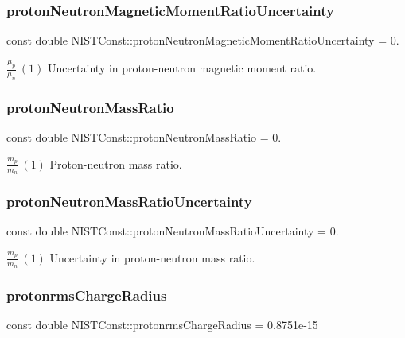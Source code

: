 \subsubsection{\texorpdfstring{proton\+Neutron\+Magnetic\+Moment\+Ratio\+Uncertainty}{protonNeutronMagneticMomentRatioUncertainty}}
{\footnotesize\ttfamily const double N\+I\+S\+T\+Const\+::proton\+Neutron\+Magnetic\+Moment\+Ratio\+Uncertainty = 0.}

$\frac{\mu_p}{\mu_n} \ (1)$ Uncertainty in proton-\/neutron magnetic moment ratio. \mbox{\label{group___proton_ga8b54a81cc7dec7f196f874dcc81dbab2}} 
\subsubsection{\texorpdfstring{proton\+Neutron\+Mass\+Ratio}{protonNeutronMassRatio}}
{\footnotesize\ttfamily const double N\+I\+S\+T\+Const\+::proton\+Neutron\+Mass\+Ratio = 0.}

$\frac{m_p}{m_n} \ (1)$ Proton-\/neutron mass ratio. \mbox{\label{group___proton_ga722d9bfcefc00b2a9c4e40ffbb689518}} 
\subsubsection{\texorpdfstring{proton\+Neutron\+Mass\+Ratio\+Uncertainty}{protonNeutronMassRatioUncertainty}}
{\footnotesize\ttfamily const double N\+I\+S\+T\+Const\+::proton\+Neutron\+Mass\+Ratio\+Uncertainty = 0.}

$\frac{m_p}{m_n} \ (1)$ Uncertainty in proton-\/neutron mass ratio. \mbox{\label{group___proton_gadc726e50679ce96f2d6c0e84c378998e}} 
\subsubsection{\texorpdfstring{protonrms\+Charge\+Radius}{protonrmsChargeRadius}}
{\footnotesize\ttfamily const double N\+I\+S\+T\+Const\+::protonrms\+Charge\+Radius = 0.\+8751e-\/15}

